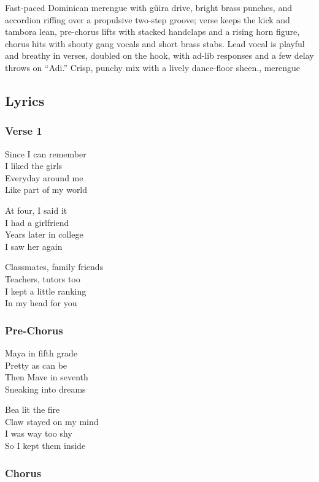 Fast-paced Dominican merengue with güira drive, bright brass punches,
and accordion riffing over a propulsive two-step groove; verse keeps the
kick and tambora lean, pre-chorus lifts with stacked handclaps and a
rising horn figure, chorus hits with shouty gang vocals and short brass
stabs. Lead vocal is playful and breathy in verses, doubled on the hook,
with ad-lib responses and a few delay throws on ``Adi.'' Crisp, punchy
mix with a lively dance-floor sheen., merengue

\subsection{Lyrics}\label{lyrics-24}

\subsubsection{Verse 1}\label{verse-1-20}

Since I can remember\\
I liked the girls\\
Everyday around me\\
Like part of my world

At four, I said it\\
I had a girlfriend\\
Years later in college\\
I saw her again

Classmates, family friends\\
Teachers, tutors too\\
I kept a little ranking\\
In my head for you

\subsubsection{Pre-Chorus}\label{pre-chorus-31}

Maya in fifth grade\\
Pretty as can be\\
Then Mave in seventh\\
Sneaking into dreams

Bea lit the fire\\
Claw stayed on my mind\\
I was way too shy\\
So I kept them inside

\subsubsection{Chorus}\label{chorus-50}

